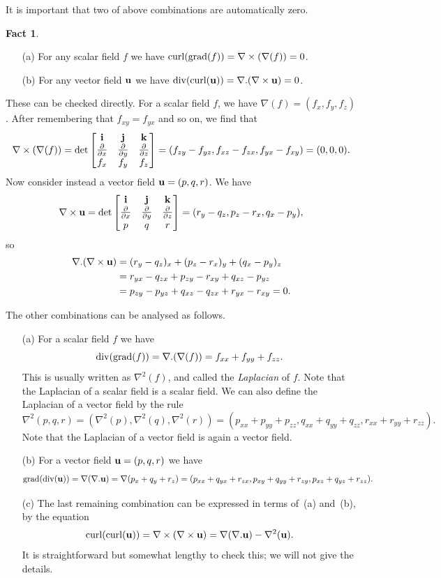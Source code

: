 \documentclass[reqno]{amsart}
\theoremstyle{definition}
\newtheorem{fact}[theorem]{Fact}
\begin{document}
It is important that two of above combinations are automatically zero.
\begin{fact}\label{fact-d-squared}
 \begin{itemize}
  \item[(a)] For any scalar field $f$ we have
   $\operatorname{curl}(\operatorname{grad}(f))=\nabla\times(\nabla(f))=0$.
  \item[(b)] For any vector field $\mathbf{u}$ we have
   $\operatorname{div}(\operatorname{curl}(\mathbf{u}))=\nabla.(\nabla\times\mathbf{u})=0$. 
 \end{itemize}
\end{fact}
These can be checked directly.  For a scalar field $f$, we have
$\nabla(f)=(f_x,f_y,f_z)$.  After remembering that $f_{xy}=f_{yx}$ and
so on, we find that
\[ \nabla\times(\nabla(f)) = 
    \det\left[\begin{matrix} \mathbf{i} & \mathbf{j} & \mathbf{k} \\
           \frac{\partial}{\partial x} &
           \frac{\partial}{\partial y} &
           \frac{\partial}{\partial z} \\
            f_x & f_y & f_z \end{matrix}\right] = 
     (f_{zy}-f_{yz},f_{xz}-f_{zx},f_{yx}-f_{xy}) = (0,0,0).
\]
Now consider instead a vector field $\mathbf{u}=(p,q,r)$.  We have 
\[  \nabla\times\mathbf{u} = 
  \det\left[\begin{matrix} \mathbf{i} & \mathbf{j} & \mathbf{k} \\
           \frac{\partial}{\partial x} &
           \frac{\partial}{\partial y} &
           \frac{\partial}{\partial z} \\
           p & q & r \end{matrix}\right] = 
   (r_y-q_z,p_z-r_x,q_x-p_y), 
\]
so
\begin{align*}
 \nabla.(\nabla\times\mathbf{u})
  &= (r_y-q_z)_x + (p_z-r_x)_y + (q_x-p_y)_z \\
  &= r_{yx} - q_{zx} + p_{zy} - r_{xy} + q_{xz} - p_{yz} \\
  &= p_{zy} - p_{yz} + q_{xz} - q_{zx} + r_{yx} - r_{xy} = 0.
\end{align*}

The other combinations can be analysed as follows.
\begin{itemize}
 \item[(a)] For a scalar field $f$ we have
  \[ \operatorname{div}(\operatorname{grad}(f)) = \nabla.(\nabla(f)) = f_{xx}+f_{yy}+f_{zz}. \]
  This is usually written as $\nabla^2(f)$, and called the
  \emph{Laplacian} of $f$.  Note that the Laplacian of a scalar field
  is a scalar field.  We can also define the Laplacian of a vector
  field by the rule
  \[ \nabla^2(p,q,r) = (\nabla^2(p),\nabla^2(q),\nabla^2(r)) = 
     (p_{xx}+p_{yy}+p_{zz},q_{xx}+q_{yy}+q_{zz},r_{xx}+r_{yy}+r_{zz}).
  \]
  Note that the Laplacian of a vector field is again a vector field.
 \item[(b)] For a vector field $\mathbf{u}=(p,q,r)$ we have
  \[ \operatorname{grad}(\operatorname{div}(\mathbf{u})) = \nabla(\nabla.\mathbf{u}) = \nabla(p_x+q_y+r_z) = 
      (p_{xx}+q_{yx}+r_{zx},
       p_{xy}+q_{yy}+r_{zy},
       p_{xz}+q_{yz}+r_{zz}).
  \]
 \item[(c)] The last remaining combination can be expressed in terms
  of~(a) and~(b), by the equation 
  \[ \operatorname{curl}(\operatorname{curl}(\mathbf{u})) = \nabla\times(\nabla\times\mathbf{u}) = 
      \nabla(\nabla.\mathbf{u}) - \nabla^2(\mathbf{u}).
  \]
  It is straightforward but somewhat lengthy to check this; we will
  not give the details.
\end{itemize}
\end{document}
